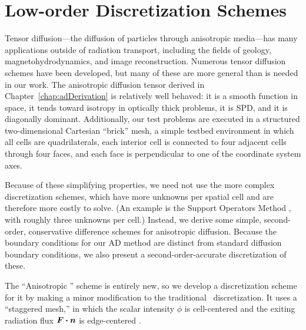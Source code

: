 

\chapter{Low-order Discretization Schemes} \label{chap:implementation}

Tensor diffusion---the diffusion of particles through anisotropic media---has
many applications outside of radiation transport, including the fields of geology,
magnetohydrodynamics, and image reconstruction. Numerous tensor diffusion
schemes have been developed, but many of these are more general than is needed
in our work. The anisotropic diffusion tensor derived in
Chapter~\ref{chap:adDerivation} is relatively well behaved: it is a smooth
function in space, it tends toward isotropy in optically thick problems, it is
SPD, and it is diagonally dominant. Additionally, our test problems
are executed in a structured
two-dimensional Cartesian ``brick'' mesh, a simple testbed environment in which
all cells are
quadrilaterals, each interior cell is connected to four adjacent cells through
four faces, and each face is
perpendicular to one of the coordinate system axes.

Because of these simplifying properties, we need not use the more
complex discretization schemes, which have more unknowns
per spatial cell and are therefore more costly to solve.
(An example is the Support Operators Method \cite{Mor1998,Run2006}, with
roughly three unknowns per cell.) Instead, we derive some simple, second-order,
conservative
difference schemes for anisotropic diffusion. Because the
boundary conditions for our AD method are distinct from standard diffusion
boundary conditions, we also present a second-order-accurate discretization of
these.

The ``Anisotropic \Pone'' scheme is entirely new, so we develop a discretization
scheme for it by making a minor modification to the traditional \Pone\
discretization. It uses a ``staggered mesh,'' in which the scalar intensity
$\phi$ is cell-centered and the exiting radiation flux $\bm{F}\bm{\cdot} \bm{n}$ is
edge-centered \cite{War2003}.

